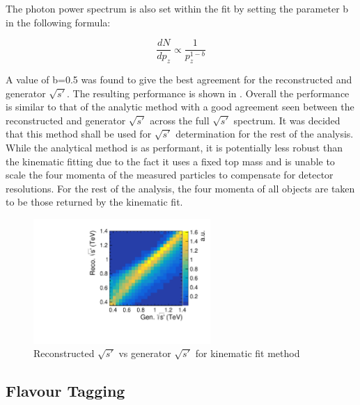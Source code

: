 The photon power spectrum is also set within the fit by setting the parameter b in the following formula:

\begin{equation}
\frac{dN}{dp_z}\propto\frac{1}{p_z^{1-b}}
\end{equation}

A value of b=0.5 was found to give the best agreement for the reconstructed and generator $\sqrt{s'}$. The resulting performance is shown in . Overall the performance is similar to that of the analytic method with a good agreement seen between the reconstructed and generator $\sqrt{s'}$ across the full $\sqrt{s'}$ spectrum. It was decided that this method shall be used for $\sqrt{s'}$ determination for the rest of the analysis. While the analytical method is as performant, it is potentially less robust than the kinematic fitting due to the fact it uses a fixed top mass and is unable to scale the four momenta of the measured particles to compensate for detector resolutions.  For the rest of the analysis, the four momenta of all objects are taken to be those returned by the kinematic fit.

\begin{figure}
  \centering
  \includegraphics[width=0.6\textwidth]{TopAnalysis/figures/KinEVsTrueE.pdf}
  \caption[Reconstructed $\sqrt{s'}$ vs generator $\sqrt{s'}$ for kinematic fit  method]{Reconstructed $\sqrt{s'}$ vs generator $\sqrt{s'}$ for kinematic fit method}
  \label{fig:KinFit}
\end{figure}

\subsection{Flavour Tagging}
\label{Flavour Tagging}

